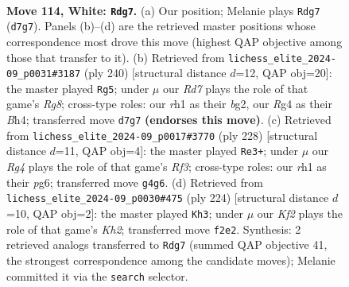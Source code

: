 \documentclass[11pt]{article}
\begin{document}
\clearpage

\begin{figure}[p]\centering
\begin{subfigure}{0.46\textwidth}\centering
\resizebox{\linewidth}{!}{%
\newchessgame
\chessboard[
  setfen={4k3/3R4/4p3/4P3/5PR1/8/5K2/7r w - - 13 114},
  showmover=false,
  pgfstyle=straightmove, color=movearrow, markmove={d7-g7}
]}
\caption{}
\end{subfigure}\hfill
\begin{subfigure}{0.46\textwidth}\centering
\resizebox{\linewidth}{!}{%
\newchessgame
\chessboard[
  setfen={6R1/7k/4r3/2P4p/K6B/6P1/6b1/8 w - - 57 121},
  showmover=false,
  pgfstyle=straightmove, color=movearrow, markmove={g8-g5}
]}
\caption{}
\end{subfigure}
\\[4pt]
\begin{subfigure}{0.46\textwidth}\centering
\resizebox{\linewidth}{!}{%
\newchessgame
\chessboard[
  setfen={8/r7/4k1p1/7p/7P/5RP1/8/6K1 w - - 66 115},
  showmover=false,
  pgfstyle=straightmove, color=movearrow, markmove={f3-e3}
]}
\caption{}
\end{subfigure}\hfill
\begin{subfigure}{0.46\textwidth}\centering
\resizebox{\linewidth}{!}{%
\newchessgame
\chessboard[
  setfen={8/6k1/2R5/7p/7P/6P1/7K/r7 w - - 71 113},
  showmover=false,
  pgfstyle=straightmove, color=movearrow, markmove={h2-h3}
]}
\caption{}
\end{subfigure}
\caption{\textbf{Move 114, White: \texttt{Rdg7}.} (a) Our position; Melanie plays \texttt{Rdg7} (\texttt{d7g7}). Panels (b)--(d) are the retrieved master positions whose correspondence most drove this move (highest QAP objective among those that transfer to it). (b) Retrieved from \texttt{lichess\_elite\_2024-09\_p0031\#3187} (ply 240) [structural distance $d$=12, QAP obj=20]: the master played \texttt{Rg5}; under $\mu$ our \emph{Rd7} plays the role of that game's \emph{Rg8}; cross-type roles: our \emph{r}h1 as their \emph{b}g2, our \emph{R}g4 as their \emph{B}h4; transferred move \texttt{d7g7} \textbf{(endorses this move)}. (c) Retrieved from \texttt{lichess\_elite\_2024-09\_p0017\#3770} (ply 228) [structural distance $d$=11, QAP obj=4]: the master played \texttt{Re3+}; under $\mu$ our \emph{Rg4} plays the role of that game's \emph{Rf3}; cross-type roles: our \emph{r}h1 as their \emph{p}g6; transferred move \texttt{g4g6}. (d) Retrieved from \texttt{lichess\_elite\_2024-09\_p0030\#475} (ply 224) [structural distance $d$=10, QAP obj=2]: the master played \texttt{Kh3}; under $\mu$ our \emph{Kf2} plays the role of that game's \emph{Kh2}; transferred move \texttt{f2e2}. Synthesis: 2 retrieved analogs transferred to \texttt{Rdg7} (summed QAP objective 41, the strongest correspondence among the candidate moves); Melanie committed it via the \texttt{search} selector.}
\label{fig:thought-m226}
\end{figure}
\end{document}
